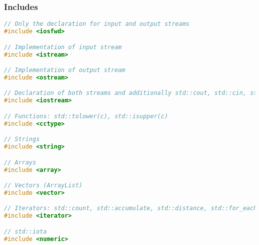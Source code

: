 
\subsubsection{Includes}
\begin{lstlisting}[style=frame, style= linenumbers, language=C]
// Only the declaration for input and output streams
#include <iosfwd>

// Implementation of input stream
#include <istream>

// Implementation of output stream
#include <ostream>

// Declaration of both streams and additionally std::cout, std::cin, std::cerr
#include <iostream>

// Functions: std::tolower(c), std::isupper(c)
#include <cctype>

// Strings
#include <string>

// Arrays
#include <array>

// Vectors (ArrayList)
#include <vector>

// Iterators: std::count, std::accumulate, std::distance, std::for_each
#include <iterator>

// std::iota
#include <numeric>


\end{lstlisting}